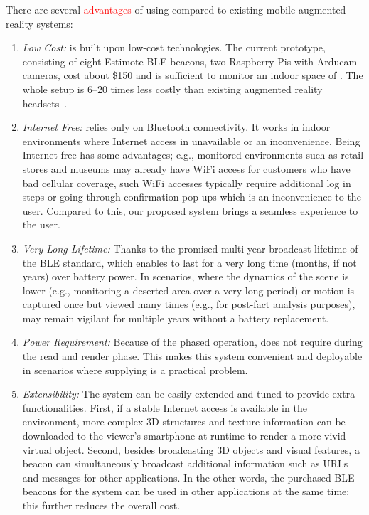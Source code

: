 There are several \textcolor{red}{advantages} of using \Sys compared to existing mobile augmented reality systems:

\begin{enumerate}
    \item \textit{Low Cost:} \Sys is built upon low-cost technologies. The current prototype, consisting of eight Estimote BLE beacons, two Raspberry Pis with Arducam cameras, cost about \$150 and is sufficient to monitor an indoor space of . The whole setup is 6--20 times less costly than existing augmented reality headsets~\cite{vuzix, hololens}.

    \item \textit{Internet Free:} \Sys relies only on Bluetooth connectivity. It works in indoor environments where Internet access in unavailable or an inconvenience. Being Internet-free has some advantages; e.g., monitored environments such as retail stores and museums may already have WiFi access for customers who have bad cellular coverage, such WiFi accesses typically require additional log in steps or going through confirmation pop-ups which is an inconvenience to the user. Compared to this, our proposed system brings a seamless experience to the user.

    \item \textit{Very Long Lifetime:} Thanks to the promised multi-year broadcast lifetime of the BLE standard, which enables \Sys to last for a very long time (months, if not years) over battery power. In scenarios, where the dynamics of the scene is lower (e.g., monitoring a deserted area over a very long period) or motion is captured once but viewed many times (e.g., for post-fact analysis purposes), \Sys may remain vigilant for multiple years without a battery replacement.

    \item \textit{ Power Requirement:} Because of the phased operation, \Sys does not require  during the read and render phase. This makes this system convenient and deployable in scenarios where supplying  is a practical problem.

    \item \textit{Extensibility:} The system can be easily extended and tuned to provide extra functionalities. First, if a stable Internet access is available in the environment, more complex 3D structures and texture information can be downloaded to the viewer's smartphone at runtime to render a more vivid virtual object. Second, besides broadcasting 3D objects and visual features, a beacon can simultaneously broadcast additional information such as URLs and messages for other applications. In the other words, the purchased BLE beacons for the system can be used in other applications at the same time; this further reduces the overall cost.
\end{enumerate}

